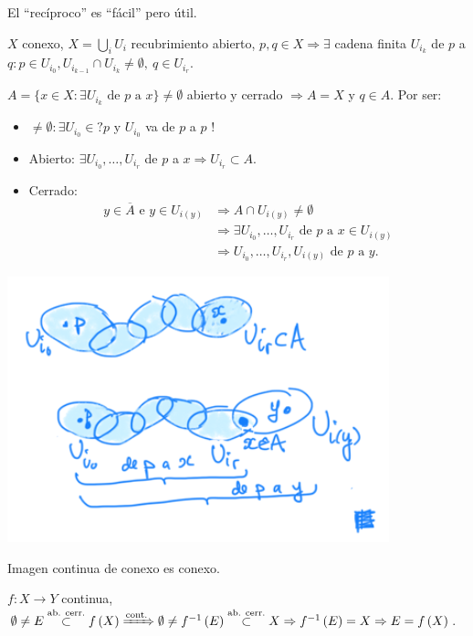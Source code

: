 El ``recíproco'' es ``fácil'' pero útil.
\begin{prop}
$X$ conexo, $X = \bigcup_{i} U_i$ recubrimiento abierto, $p, q \in X \Rightarrow \exists$ cadena finita $U_{i_k}$ de $p$ a $q: p \in U_{i_0}, U_{i_{k - 1}} \cap U_{i_k} \neq \emptyset,\ q \in U_{i_r}$. 
\end{prop}
\begin{demo}
$A = \{x \in X: \exists U_{i_k} \text{ de } p \text{ a } x\} \neq \emptyset$ abierto y cerrado $\Rightarrow A = X$ y $q \in A$. Por ser:
\begin{itemize}
    \item $\neq \emptyset: \exists U_{i_0} \in? p$ y $U_{i_0}$ va de $p$ a $p$ !
    \item Abierto: $\exists U_{i_0}, \ldots, U_{i_r}$ de $p$ a $x \Rightarrow U_{i_r} \subset A$.
    \item Cerrado: 
    \begin{align*}
        y \in \overline{A} \text{ e } y \in U_{i\left( y \right)} &\Rightarrow A \cap U_{i\left( y \right)} \neq \emptyset\\
        &\Rightarrow \exists U_{i_0}, \ldots, U_{i_r} \text{ de } p \text{ a } x\in U_{i\left( y \right)}\\
        &\Rightarrow U_{i_0}, \ldots, U_{i_r}, U_{i\left( y \right)} \text{ de } p \text{ a } y
    .\end{align*}
\end{itemize}
\begin{center}
    \includegraphics[scale=0.3]{images/dem_const_cadenas} 
\end{center}
\end{demo}

\begin{prop}[Mantra 2]
Imagen continua de conexo es conexo. 
\end{prop}
\begin{demo}
    $f: X \rightarrow Y$ continua, $\emptyset \neq E \stackrel{\text{ab. cerr.}}{\subset} f\left( X \right) \xRightarrow{\text{cont.}} \emptyset \neq f^{-1}\left( E \right) \stackrel{\text{ab. cerr.}}{\subset} X \Rightarrow f^{-1}\left( E \right) = X \Rightarrow E = f\left( X \right)$.
\end{demo}

